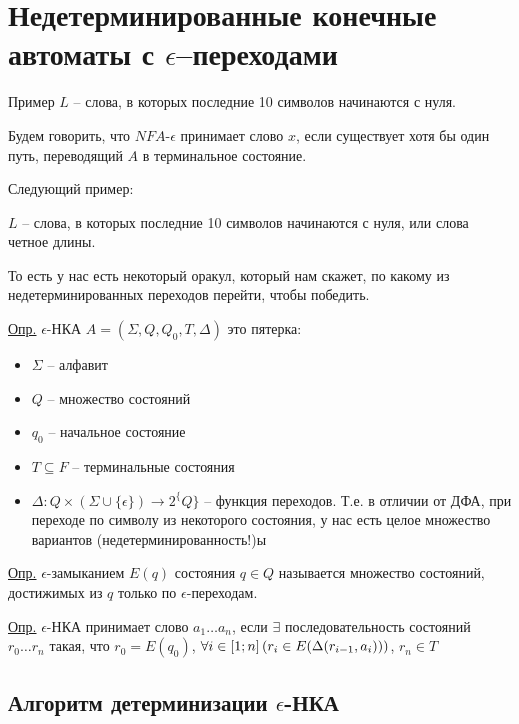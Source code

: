 \section{Недетерминированные конечные автоматы с $ \epsilon $--переходами}

Пример $ L $ -- слова, в которых последние 10 символов начинаются с нуля.


Будем говорить, что $ NFA$-$\epsilon$ принимает слово $ x $, если существует хотя бы один путь, переводящий $ A $ в терминальное состояние.

Следующий пример:

$ L $ -- слова, в которых последние 10 символов начинаются с нуля, или слова четное длины.


То есть у нас есть некоторый оракул, который нам скажет, по какому из недетерминированных переходов перейти, чтобы победить. 

\underline{Опр.} $ \epsilon $-НКА $ A = (\Sigma, Q, Q_0, T, \Delta) $ это пятерка:

\begin{itemize}
	\item $ \Sigma $ -- алфавит
	
	\item $ Q $ -- множество состояний
	
	\item $q_0$ -- начальное состояние
	
	\item $ T \subseteq F $ -- терминальные состояния
	
	\item $ \Delta \colon Q \times (\Sigma \cup \{ \epsilon \}) \to 2^\{Q\} $ -- функция переходов. Т.е. в отличии от ДФА, при переходе по символу из некоторого состояния, у нас есть целое множество вариантов (недетерминированность!)ы
\end{itemize}

\underline{Опр.} $ \epsilon $-замыканием $ E(q) $ состояния $ q \in Q $ называется множество состояний, достижимых из $ q $ только по $ \epsilon $-переходам.

\underline{Опр.} $ \epsilon $-НКА принимает слово $ a_1 \ldots a_n $, если $ \exists $ последовательность состояний $ r_0 \ldots r_n $ такая, что $ r_0 = E(q_0) $, $ \forall i \in [1; n] \left({r_i \in E(\Delta(r_{i - 1}, a_i))}\right) $, $ r_n \in T $

\subsection{Алгоритм детерминизации $ \epsilon $-НКА}

